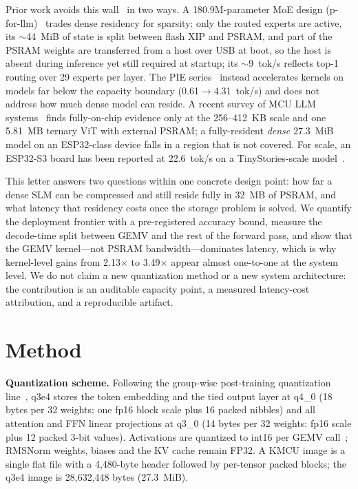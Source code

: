 \documentclass[journal,letterpaper]{IEEEtran}
\begin{document}
Prior work avoids this wall~\cite{memorywall} in two ways. A 180.9M-parameter MoE design (p-for-llm)~\cite{pforllm} trades
dense residency for sparsity: only the routed experts are active, its $\sim$44~MiB of state
is split between flash XIP and PSRAM, and part of the PSRAM weights are transferred from a
host over USB at boot, so the host is absent during inference yet still required at startup;
its $\sim$9~tok/s reflects top-1 routing over 29 experts per layer. The PIE series~\cite{pie} instead
accelerates kernels on models far below the capacity boundary (0.61$\rightarrow$4.31~tok/s)
and does not address how much dense model can reside. A recent survey of MCU LLM systems~\cite{survey}
finds fully-on-chip evidence only at the 256--412~KB scale and one 5.81~MB ternary ViT with
external PSRAM; a fully-resident \emph{dense} 27.3~MiB model on an ESP32-class device falls
in a region that is not covered. For scale, an ESP32-S3 board has been reported at 22.6~tok/s on a TinyStories-scale model~\cite{edgebench}.

This letter answers two questions within one concrete design point: how far a dense SLM can be
compressed and still reside fully in 32~MB of PSRAM, and what latency that residency costs once
the storage problem is solved. We quantify the deployment frontier with a pre-registered
accuracy bound, measure the decode-time split between GEMV and the rest of the forward pass,
and show that the GEMV kernel---not PSRAM bandwidth---dominates latency, which is why
kernel-level gains from 2.13$\times$ to 3.49$\times$ appear almost one-to-one at the system level. We do not claim a new
quantization method or a new system architecture: the contribution is an auditable capacity point,
a measured latency-cost attribution, and a reproducible artifact.

\section{Method}
\textbf{Quantization scheme.} Following the group-wise post-training quantization line~\cite{gptq,awq,llmint8}, q3e4 stores the token embedding and the tied output layer at
q4\_0 (18 bytes per 32 weights: one fp16 block scale plus 16 packed nibbles) and all attention
and FFN linear projections at q3\_0 (14 bytes per 32 weights: fp16 scale plus 12 packed
3-bit values). Activations are quantized to int16 per GEMV call~\cite{int16}; RMSNorm weights, biases and
the KV cache remain FP32. A KMCU image is a single flat file with a 4,480-byte header followed
by per-tensor packed blocks; the q3e4 image is 28,632,448 bytes (27.3~MiB).
\end{document}
